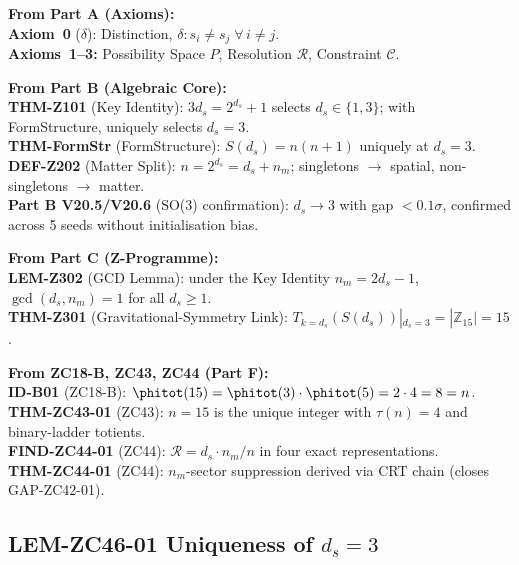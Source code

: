 \documentclass[12pt, a4paper]{article}
\begin{document}
\begin{formalbox}[title={Inherited Objects Used by ZC46}]
\textbf{From Part A (Axioms):}\\
\textbf{Axiom~0} ($\delta$): Distinction,
$\delta: s_i \neq s_j\;\forall\,i \neq j$.\\
\textbf{Axioms~1--3:} Possibility Space $P$, Resolution
$\mathcal{R}$, Constraint $\mathcal{C}$.

\medskip
\textbf{From Part B (Algebraic Core):}\\
\textbf{THM-Z101} (Key Identity): $3d_s = 2^{d_s}+1$ selects
$d_s \in \{1,3\}$; with FormStructure, uniquely selects $d_s = 3$.\\
\textbf{THM-FormStr} (FormStructure): $S(d_s) = n(n+1)$ uniquely
at $d_s = 3$.\\
\textbf{DEF-Z202} (Matter Split): $n = 2^{d_s} = d_s + n_m$;
singletons $\to$ spatial, non-singletons $\to$ matter.\\
\textbf{Part B V20.5/V20.6} (SO(3) confirmation): $d_s \to 3$
with gap $< 0.1\sigma$, confirmed across 5 seeds without
initialisation bias.

\medskip
\textbf{From Part C (Z-Programme):}\\
\textbf{LEM-Z302} (GCD Lemma): under the Key Identity
$n_m = 2d_s - 1$, $\gcd(d_s, n_m) = 1$ for all $d_s \geq 1$.\\
\textbf{THM-Z301} (Gravitational-Symmetry Link):
$T_{k=d_s}(S(d_s))|_{d_s=3} = |\mathbb{Z}_{15}| = 15$.

\medskip
\textbf{From ZC18-B, ZC43, ZC44 (Part F):}\\
\textbf{ID-B01} (ZC18-B): $\phitot(15) = \phitot(3)\cdot\phitot(5)
= 2\cdot 4 = 8 = n$.\\
\textbf{THM-ZC43-01} (ZC43): $n = 15$ is the unique integer with
$\tau(n) = 4$ and binary-ladder totients.\\
\textbf{FIND-ZC44-01} (ZC44): $\mathcal{R} = d_s\cdot n_m/n$
in four exact representations.\\
\textbf{THM-ZC44-01} (ZC44): $n_m$-sector suppression derived
via CRT chain (closes GAP-ZC42-01).
\end{formalbox}

\subsection{LEM-ZC46-01 \quad Uniqueness of $d_s = 3$}
\end{document}

